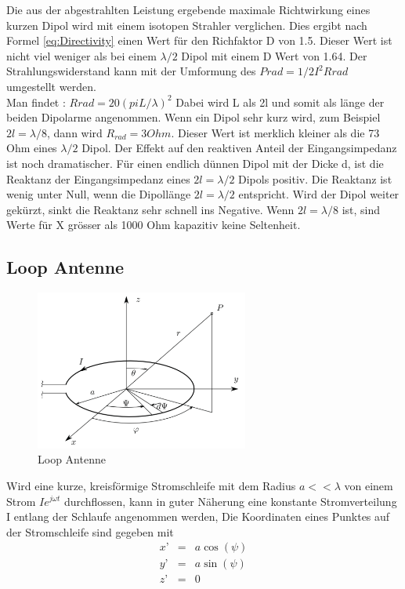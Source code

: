 Die aus der abgestrahlten Leistung ergebende maximale Richtwirkung eines kurzen Dipol wird  mit einem isotopen Strahler verglichen. Dies ergibt nach Formel \ref{eq:Directivity} einen Wert für den Richfaktor D von 1.5. Dieser Wert ist nicht viel weniger als bei einem $\lambda/2$ Dipol mit einem D Wert von 1.64.
Der Strahlungswiderstand kann mit der Umformung des $Prad=1/2 I^{2}Rrad$ umgestellt werden. \\
Man findet :
$Rrad=20\left(piL/\lambda\right)^{2}$
Dabei wird L als 2l und somit als länge der beiden Dipolarme angenommen.
Wenn ein Dipol sehr kurz wird, zum Beispiel $2l=\lambda/8$, dann wird $R_{rad} = 3 Ohm$. Dieser Wert ist merklich kleiner als   die 73 Ohm   eines $\lambda/2$ Dipol. Der Effekt auf den reaktiven Anteil der Eingangsimpedanz ist noch dramatischer. Für einen endlich dünnen Dipol mit der Dicke d, ist die Reaktanz der Eingangsimpedanz eines $2l=\lambda/2$ Dipols positiv. Die Reaktanz ist wenig unter Null, wenn die Dipollänge  $2l=\lambda/2$ entspricht. Wird der Dipol weiter gekürzt,  sinkt die Reaktanz sehr schnell ins Negative. Wenn  $2l=\lambda/8$ ist,  sind Werte für X grösser als 1000 Ohm kapazitiv keine Seltenheit. 


\subsection{Loop Antenne}\label{sec:LoopAntenneTheorie}

\begin{figure}[h]
	\centering
	\includegraphics[width=7cm]{content/bilder/Loop_EMANT_S45.pdf}%
	\caption{Loop Antenne}
	\label{LoopAntenne}
\end{figure}


Wird eine kurze, kreisförmige Stromschleife mit dem Radius $a<<\lambda$ von einem Strom $Ie^{j\omega t}$ durchflossen,  kann in guter Näherung eine konstante Stromverteilung I entlang der Schlaufe angenommen werden,
Die Koordinaten eines Punktes auf der Stromschleife sind gegeben mit
\begin{eqnarray}
x’ &=&a \cos(\psi)\\
y’ &=&a \sin(\psi)\\
z’ &=&0
\end{eqnarray}


